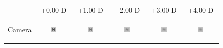 
\begin{figure}[!b]
	\centering
	
	\begin{tabular}{@{}r@{ } c@{ } c@{ } c@{ } c@{ } c }
	&
	\small{+0.00 D} &
	\small{+1.00 D} &
	\small{+2.00 D} &
	\small{+3.00 D} &
	\small{+4.00 D} & \\
 
	\begin{sideways} \parbox[b]{20mm} {Camera} \end{sideways} &
	\includegraphics[width=0.185\textwidth]{__Images/05/WB_N(20-200)_+0D_to_+4D/wb_N_20-200_Camera+0,00D(lens).png} &
	\includegraphics[width=0.185\textwidth]{__Images/05/WB_N(20-200)_+0D_to_+4D/wb_N_20-200_Camera+1,00D(lens).png} &
	\includegraphics[width=0.185\textwidth]{__Images/05/WB_N(20-200)_+0D_to_+4D/wb_N_20-200_Camera+2,00D(lens).png} &
	\includegraphics[width=0.185\textwidth]{__Images/05/WB_N(20-200)_+0D_to_+4D/wb_N_20-200_Camera+3,00D(lens).png} &
	\includegraphics[width=0.185\textwidth]{__Images/05/WB_N(20-200)_+0D_to_+4D/wb_N_20-200_Camera+4,00D(lens).png} \\
  

\end{tabular}
\end{figure}
